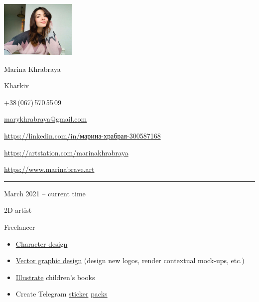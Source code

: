 \documentclass[a4paper,10pt]{article}
\newlength{\cvcolumngapwidth}
\newlength{\cvleftcolumnwidth}
\newlength{\cvrightcolumnwidth}
\newcommand{\cvnamestyle}[1]{{\Large\cvnamefont\textcolor{cvnamecolor}{#1}}}
\newcommand{\cvsectionstyle}[1]{{\normalsize\cvsectionfont\textcolor{cvsectioncolor}{#1}}}
\newcommand{\cvtitlestyle}[1]{{\large\cvtitlefont\textcolor{cvtitlecolor}{#1}}}
\newcommand{\cvdurationstyle}[1]{{\small\cvdurationfont\textcolor{cvdurationcolor}{#1}}}
\newlength{\cvafteritemskipamount}
\newlength{\cvaftersectionskipamount}
\newlength{\cvafternameskipamount}
\newlength{\cvafterpersonalinfolineskipamount}
\newlength{\cvaftertitleskipamount}
\newlength{\cvparskip}
\newcommand{\cvpersonalinfo}[2]{
\begin{minipage}[t]{\cvleftcolumnwidth}
    \vspace{0mm} %
    \raggedleft #1
\end{minipage}%
\hspace{\cvcolumngapwidth}%
\begin{minipage}[t]{\cvrightcolumnwidth}
    \vspace{0mm} %
    #2
\end{minipage}

\vspace{\cvafteritemskipamount}
}
\newcommand{\cvname}[1]{
\cvnamestyle{#1}

\vspace{\cvafternameskipamount}
}
\newcommand{\cvpersonalinfolinewithicon}[3]{
\raisebox{.5\fontcharht\font`E-.5\height}{\texttt{[image: \#2]}}
#3

\vspace{\cvafterpersonalinfolineskipamount}
}
\newcommand{\cvsection}[1]{
\begin{minipage}[t]{\cvleftcolumnwidth}
    \raggedleft\cvsectionstyle{#1}
\end{minipage}%
\hspace{\cvcolumngapwidth}%
\begin{minipage}[t]{\cvrightcolumnwidth}
    \textcolor{cvrulecolor}{\rule{\cvrightcolumnwidth}{0.3mm}}
\end{minipage}

\vspace{\cvaftersectionskipamount}
}
\newcommand{\cvitem}[2]{
\begin{minipage}[t]{\cvleftcolumnwidth}
    \raggedleft #1
\end{minipage}%
\hspace{\cvcolumngapwidth}%
\begin{minipage}[t]{\cvrightcolumnwidth}
    \setlength{\parskip}{\cvparskip} #2
\end{minipage}

\vspace{\cvafteritemskipamount}
}
\newcommand{\cvtitle}[1]{
\cvtitlestyle{#1}

\vspace{\cvaftertitleskipamount}
\vspace{-\cvparskip}
}
\begin{document}
\hypersetup{
    linkcolor=blue,
    filecolor=magenta,
    urlcolor=cyan,
}



\cvpersonalinfo{
\includegraphics[trim={36cm 20cm 25cm 0cm},clip,width=36mm]{resources/photo.jpg}
}{
\cvname{Marina Khrabraya}

\cvpersonalinfolinewithicon{height=4mm}{resources/IcoMoon-Free-PDF/072-location.pdf}{
Kharkiv
}

\cvpersonalinfolinewithicon{height=4mm}{resources/IcoMoon-Free-PDF/067-phone.pdf}{
+38\,(067)\,570\,55\,09
}

\cvpersonalinfolinewithicon{height=4mm}{resources/IcoMoon-Free-PDF/070-envelop.pdf}{
\href{mailto://marykhrabraya@gmail.com}{marykhrabraya@gmail.com}
}

\cvpersonalinfolinewithicon{height=4mm}{resources/IcoMoon-Free-PDF/458-linkedin.pdf}{
\href{https://www.linkedin.com/in/\%D0\%BC\%D0\%B0\%D1\%80\%D0\%B8\%D0\%BD\%D0\%B0-\%D1\%85\%D1\%80\%D0\%B0\%D0\%B1\%D1\%80\%D0\%B0\%D1\%8F-300587168/}{https://linkedin.com/in/марина-храбрая-300587168}
}

\cvpersonalinfolinewithicon{height=4mm}{"resources/ArtStationLogo/vector/ArtStation-logomark-dark.eps"}{
\href{https://artstation.com/marinakhrabraya}{https://artstation.com/marinakhrabraya}
}

\cvpersonalinfolinewithicon{height=4mm}{resources/IcoMoon-Free-PDF/203-earth.pdf}{
\href{https://www.marinabrave.art}{https://www.marinabrave.art}
}
}



\cvsection{WORK EXPERIENCE}

\cvitem{
\cvdurationstyle{March 2021 -- current time}
}{
\cvtitle{2D artist}

Freelancer

\begin{itemize}[leftmargin=*]
    \item \href{https://www.artstation.com/artwork/rAG99J}{Character design}
    \item \href{https://www.artstation.com/artwork/J9m9ez}{Vector graphic design} (design new logos, render contextual mock-ups, etc.)
    \item \href{https://www.artstation.com/artwork/5X3PWz}{Illustrate} children's books
    \item Create Telegram \href{https://t.me/addstickers/Nixraccoon}{sticker} \href{https://t.me/addstickers/Mam_rental}{packs}
\end{itemize}
}
\end{document}
